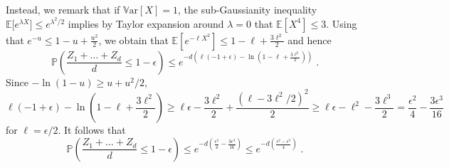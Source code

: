 \documentclass{ps}
\renewcommand{\P}{\mathbb{P}}
\newcommand{\E}{\mathbb{E}}
\newcommand{\Var}{\mathbb{V}\!\mathrm{ar}}
\newcommand{\1}{\mathbbm{1}}
\theoremstyle{plain}
\begin{document}
Instead, we remark that if $\Var[X] = 1$, the sub-Gaussianity inequality $\E\big[e^{\lambda X}\big]\leq e^{\lambda^2/2}$  implies by Taylor expansion around $\lambda = 0$ that $\E[X^4] \leq 3$.
Using that $\displaystyle{e^{-u} \leq 1-u+\frac{u^2}{2}}$, we obtain that 
$\E\left[e^{- \ell X^2}\right] \leq 1 - \ell + \frac{3\ell^2}{2}$ and hence
\[\P\left(\frac{Z_1+\dots+Z_d}{d}\leq 1-\epsilon\right) \leq  e^{-d\left( \ell(-1+\epsilon) -\ln\left(1-\ell+\frac{3\ell^2}{2}\right)\right)} 
\;.\]
Since $-\ln(1-u)\geq u+u^2/2$, 
\[\ell(-1+\epsilon ) -\ln\left(1-\ell+\frac{3\ell^2}{2}\right) \geq \ell\epsilon - \frac{3\ell^2}{2}  + \frac{(\ell-3\ell^2/2)^2}{2}  \geq \ell\epsilon - \ell^2 - \frac{3\ell^3}{2}  = \frac{\epsilon^2}{4} -\frac{3\epsilon^3}{16}\]
for $\ell = \epsilon/2$.
It follows that 
\begin{equation}\label{eq:chernoffLB}\P\left(\frac{Z_1+\dots+Z_d}{d}\leq 1-\epsilon\right)\leq e^{-d\left(\frac{\epsilon^2}{4} -\frac{3\epsilon^3}{16}\right)} \leq 
e^{-d\left(\frac{\epsilon^2 - \epsilon^3}{4} \right)} 
\;.\end{equation}
\end{document}
